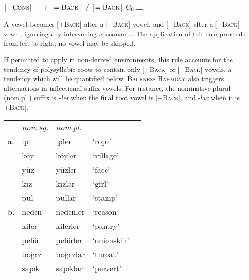 \begin{example}
$\begin{bmatrix} -\textsc{Cons} \end{bmatrix}~\goesto~\begin{bmatrix} =\textsc{Back} \end{bmatrix}~\big /~\begin{bmatrix} =\textsc{Back} \end{bmatrix}~\textrm{C}_0~\gap$
\end{example}

\noindent
A vowel becomes [$+$\textsc{Back}] after a [$+$\textsc{Back}] vowel, and [$-$\textsc{Back}] after a [$-$\textsc{Back}] vowel, ignoring any intervening consonants. The application of this rule proceeds from left to right; no vowel may be skipped.

If permitted to apply in non-derived environments, this rule accounts for the tendency of polysyllabic roots to contain only [$+$\textsc{Back}] or [$-$\textsc{Back}] vowels, a tendency which will be quantified below. \textsc{Backness Harmony} also triggers alternations in inflectional suffix vowels. For instance, the nominative plural (nom.pl.) suffix is \emph{-ler} when the final root vowel is [$-$\textsc{Back}], and \emph{-lar} when it is [$+$\textsc{Back}].

\begin{example}
\label{turknom}
\begin{tabular}{lllll}
   & \emph{nom.sg.} & \emph{nom.pl.} \\
a. & {ip}           & {ipler}    & `rope'         & \citep[][216]{Clements1982} \\
   & {köy}          & {köyler}   & `village'      \\
   & {yüz}          & {yüzler}   & `face'         \\
   & {kız}          & {kızlar}   & `girl'         \\
   & {pul}          & {pullar}   & `stamp'        \\
b. & {neden}        & {nedenler} & `reason'       & \citep{TELL} \\
   & {kiler}        & {kilerler} & `pantry'       \\
   & {pelür}        & {pelürler} & `onionskin'    \\
   & {boğaz}        & {boğazlar} & `throat'       \\
   & {sapık}        & {sapıklar} & `pervert'      \\
\end{tabular}
\end{example}

